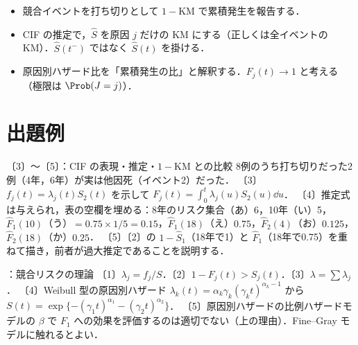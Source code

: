 \begin{warnbox}
\begin{itemize}
\item 競合イベントを打ち切りとして $1-\mathrm{KM}$ で累積発生を報告する．
\item CIF の推定で，$\hat S$ を原因 $j$ だけの KM にする（正しくは全イベントの KM）．$\hat S(t^-)$ ではなく $\hat S(t)$ を掛ける．
\item 原因別ハザード比を「累積発生の比」と解釈する．$F_j(t)\to1$ と考える（極限は $\Prob(J=j)$）．
\end{itemize}
\end{warnbox}

\section{出題例}\label{sec:m05-shutsudai}
\begin{shutsudai}{〔3〕〜〔5〕：CIF の表現・推定・$1-\mathrm{KM}$ との比較}
8例のうち打ち切りだった2例（4年，6年）が実は他因死（イベント2）だった．
〔3〕$f_j(t)=\lambda_j(t)S_2(t)$ を示して $F_j(t)=\int_0^t\lambda_j(u)S_2(u)\dd u$．
〔4〕推定式は与えられ，表の空欄を埋める：8年のリスク集合（あ）6，10年（い）5，$\hat F_1(10)$（う）$=0.75\times1/5=0.15$，$\hat F_1(18)$（え）$0.75$，$\hat F_2(4)$（お）$0.125$，$\hat F_2(18)$（か）$0.25$．
〔5〕〔2〕の $1-\hat S_1$（18年で1）と $\hat F_1$（18年で0.75）を重ねて描き，前者が過大推定であることを説明する．
\end{shutsudai}
\begin{shutsudai}{：競合リスクの理論}
〔1〕$\lambda_j=f_j/S$．〔2〕$1-F_j(t)>S_j(t)$．〔3〕$\lambda=\sum\lambda_j$．
〔4〕Weibull 型の原因別ハザード $\lambda_k(t)=\alpha_k\gamma_k(\gamma_kt)^{\alpha_k-1}$ から $S(t)=\exp\{-(\gamma_1t)^{\alpha_1}-(\gamma_2t)^{\alpha_2}\}$．
〔5〕原因別ハザードの比例ハザードモデルの $\beta$ で $F_1$ への効果を評価するのは適切でない（上の理由）．Fine--Gray モデルに触れるとよい．
\end{shutsudai}

